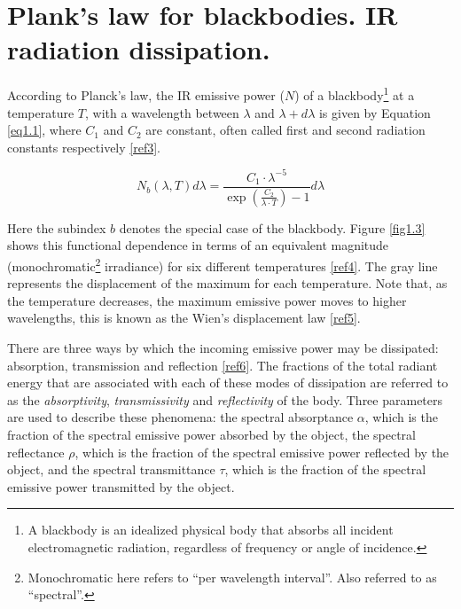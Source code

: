 	\section{Plank's law for blackbodies. IR radiation dissipation.}\label{section1.2}
	
		According to Planck’s law, the IR emissive power ($N$) of a blackbody\footnote{{\footnotesize A blackbody is an idealized physical body that absorbs all incident electromagnetic radiation, regardless of frequency or angle of incidence.}} at a temperature $T$, with a wavelength between $\lambda$ and $\lambda+d\lambda$ is given by Equation \ref{eq1.1}, where $C_{1}$ and $C_{2}$ are constant, often called first and second radiation constants respectively \ref{ref3}.
		
		\begin{equation}\label{eq1.1}
			N_{b}(\lambda,T)d\lambda=\frac{C_{1} \cdot \lambda^{-5}}{\exp (\frac{C_{2}}{\lambda\cdot T}) -1} d\lambda
		\end{equation}\bigskip
		
		Here the subindex $b$ denotes the special case of the blackbody. Figure \ref{fig1.3} shows this functional dependence in terms of an equivalent magnitude (monochromatic\footnote{{\footnotesize Monochromatic here refers to “per wavelength interval”. Also referred to as “spectral”.}} irradiance) for six different temperatures \ref{ref4}. The gray line represents the displacement of the maximum for each temperature. Note that, as the temperature decreases, the maximum emissive power moves to higher wavelengths, this is known as the Wien’s displacement law \ref{ref5}.
		
		There are three ways by which the incoming emissive power may be dissipated: absorption, transmission and reflection \ref{ref6}. The fractions of the total radiant energy that are associated with each of these modes of dissipation are referred to as the \textit{absorptivity}, \textit{transmissivity} and \textit{reflectivity} of the body. Three parameters are used to describe these phenomena: the spectral absorptance $\alpha$, which is the fraction of the spectral emissive power absorbed by the object, the spectral reflectance $\rho$, which is the fraction of the spectral emissive power reflected by the object, and the spectral transmittance $\tau$, which is the fraction of the spectral emissive power transmitted by the object.
		
